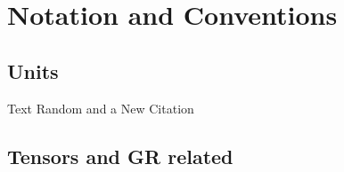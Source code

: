 \chapter*{Notation and Conventions}

\section*{Units}

Text Random and a New Citation

\section*{Tensors and GR related}

\lipsum[3]

\cleardoublepage